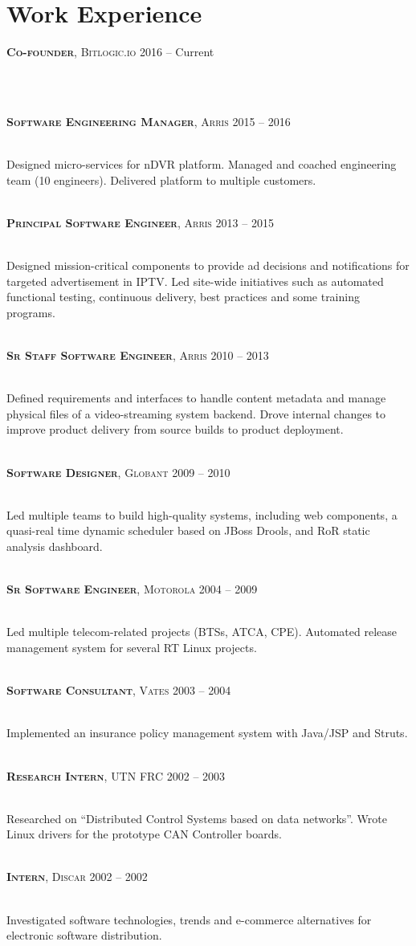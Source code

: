 \documentclass[10pt]{article}
\newcommand \jobdesc[4] {%
	{{\raggedright \large \textbf{\textsc{#1}}, \normalsize\textsc{#2} \hfill \normalsize{\textsc #3 -- #4}}}
}
\begin{document}
\begin{minipage}[t]{0.5\textwidth}
\section{Work Experience} 
\jobdesc{Co-founder}{Bitlogic.io}{2016}{Current}\\
\\
\jobdesc{Software Engineering Manager}{Arris}{2015}{2016}\\
\normalsize{Designed micro-services for nDVR platform. Managed and coached engineering team (10 engineers). Delivered platform to multiple customers.}\\
\\
\jobdesc{Principal Software Engineer}{Arris}{2013}{2015}\\
\normalsize{Designed mission-critical components to provide ad decisions and notifications for targeted advertisement in IPTV. Led site-wide initiatives such as automated functional testing, continuous delivery, best practices and some training programs.}\\
\\
\jobdesc{Sr Staff Software Engineer}{Arris}{2010}{2013}\\
\normalsize{Defined requirements and interfaces to handle content metadata and manage physical files of a video-streaming system backend. Drove internal changes to improve product delivery from source builds to product deployment.}\\
\\
\jobdesc{Software Designer}{Globant}{2009}{2010}\\
\normalsize{Led multiple teams to build high-quality systems, including web components, a quasi-real time dynamic scheduler based on JBoss Drools, and RoR static analysis dashboard.}\\
\\
\jobdesc{Sr Software Engineer}{Motorola}{2004}{2009}\\
\normalsize{Led multiple telecom-related projects (BTSs, ATCA, CPE). Automated release management system for several RT Linux projects.}\\
\\
\jobdesc{Software Consultant}{Vates}{2003}{2004}\\
\normalsize{Implemented an insurance policy management system with Java/JSP and Struts.}\\
\\
\jobdesc{Research Intern}{UTN FRC}{2002}{2003}\\
\normalsize{Researched on “Distributed Control Systems based on data networks”. Wrote Linux drivers for the prototype CAN Controller boards.}\\
\\
\jobdesc{Intern}{Discar}{2002}{2002}\\
\normalsize{Investigated software technologies, trends and e-commerce alternatives for electronic software distribution.}


\end{minipage} %
\end{document}
